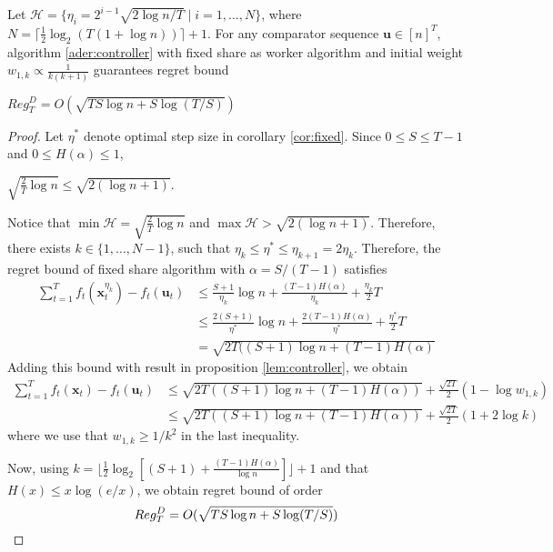\documentclass[12pt, a4paper]{report}
\begin{document}
\begin{prop}
Let $\mathcal{H} = \{ \eta_i = 2^{i-1}\sqrt{2 \log n / T} \mid i = 1, \dots, N \}$, where $N = \lceil \frac{1}{2} \log_2 (T(1 + \log n))\rceil + 1$. For any comparator sequence $\mathbf{u} \in [n]^T$, algorithm \ref{ader:controller} with fixed share as worker algorithm and initial weight $w_{1, k} \propto \frac{1}{k(k+1)}$ guarantees regret bound
\begin{center}
$Reg_T^D = O(\sqrt{TS\log n +S\log(T/S)})$
\end{center}
\end{prop}
\begin{proof}
Let $\eta^*$ denote optimal step size in corollary \ref{cor:fixed}. Since $0 \leq S \leq T-1$ and $0 \leq H(\alpha) \leq 1$,
\begin{center}
    $\displaystyle \sqrt{\frac{2}{T} \log n} \leq \sqrt{2(\log n + 1)}$.
\end{center}
Notice that $\min \mathcal{H} = \sqrt{\frac{2}{T} \log n}$ and $\max \mathcal{H} > \sqrt{2 (\log n + 1)}$. Therefore, there exists $k \in \{1, \dots, N-1\}$, such that $\eta_k \leq \eta^* \leq \eta_{k+1} = 2\eta_k$. Therefore, the regret bound of fixed share algorithm with $\alpha = S / (T - 1)$ satisfies
\begin{align*}
    \sum_{t=1}^T f_t(\mathbf{x}_t^{\eta_k}) - f_t(\mathbf{u}_t) &\leq \frac{S+1}{\eta_k} \log n + \frac{(T-1)H(\alpha)}{\eta_k} + \frac{\eta_k}{2}T 
    \\
    & \leq \frac{2(S+1)}{\eta^*} \log n + \frac{2(T-1)H(\alpha)}{\eta^*} + \frac{\eta^*}{2}T
    \\
    &= \sqrt{2T((S+1) \log n + (T-1) H(\alpha)}
\end{align*}
Adding this bound with result in proposition \ref{lem:controller}, we obtain
\begin{align*}
    \sum_{t=1}^T f_t(\mathbf{x}_t) - f_t(\mathbf{u}_t) &\leq \sqrt{2T((S+1)\log n + (T-1)H(\alpha))} + \frac{\sqrt{2T}}{2}(1 - \log w_{1, k})
    \\
    &\leq\sqrt{2T((S+1)\log n + (T-1)H(\alpha))} + \frac{\sqrt{2T}}{2}(1 + 2 \log k)
\end{align*}
where we use that $w_{1, k} \geq 1/k^2$ in the last inequality. 

Now, using $k = \lfloor \frac{1}{2} \log_2 \left[ (S+1) + \frac{(T-1)H(\alpha)}{\log n}\right]\rfloor + 1$ and that $H(x) \leq x \log (e/x)$, we obtain regret bound of order 
\begin{equation*}
    Reg_T^D = O(\sqrt{TS\log n +S\log(T/S)}) \qedhere
\end{equation*}
\end{proof}
\end{document}
